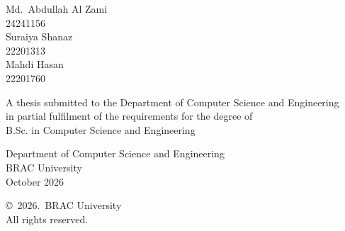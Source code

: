 \begin{titlepage}
\renewcommand*{\thepage}{Title} %

    \begin{center}
        \vspace*{3cm} %

        {\fontsize{16pt}{22pt}\selectfont{The Geometry of Lies:\\[4pt]
        Knowledge and Persona Directions for Detecting\\
        Deception in Large Language Models}
        } %

        \vspace{1.5cm}


        \vspace{0.5cm}

        	Md.\ Abdullah Al Zami\\
	        24241156\\
	        Suraiya Shanaz\\
	        22201313\\
	        Mahdi Hasan\\
	        22201760

        \vspace{1.5cm}

        	A thesis submitted to the Department of Computer Science and Engineering\\
            in partial fulfilment of the requirements for the degree of\\
            B.Sc. in Computer Science and Engineering


        \vspace{2.5cm}

    		Department of Computer Science and Engineering\\
            BRAC University\\
            October 2026

        \vspace{3cm}

    		\copyright\ 2026.\ BRAC University\\
            All rights reserved.

    \end{center}

\end{titlepage}
